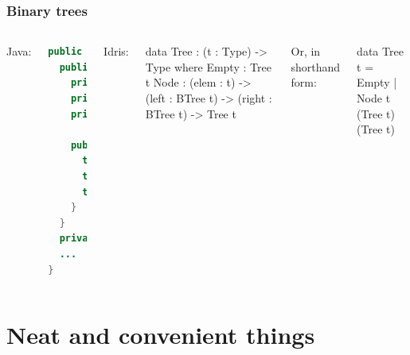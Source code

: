 \documentclass{beamer}
\begin{document}
  \begin{frame}[fragile]
    \frametitle{Binary trees}

    \begin{columns}
      Java:
      {\scriptsize
      \begin{lstlisting}[language=java]
public class Tree<T> {
  public static class Node<T> {
    private T content;
    private Node<T> left;
    private Node<T> right;

    public Node(T elem) {
      this.elem = elem;
      this.right = null;
      this.left = null;
    }
  }
  private Node<T> root;
  ...
}
      \end{lstlisting}
      }

      Idris:

      \begin{idrislisting}[basicstyle=\ttfamily\scriptsize]
data Tree : (t : Type) -> Type where
  Empty : Tree t
  Node  : (elem : t) ->
          (left : BTree t) ->
          (right : BTree t) ->
          Tree t
      \end{idrislisting}

      \vspace*{1mm}

      {\footnotesize Or, in shorthand form:}

      \vspace*{-2mm}

      \begin{idrislisting}[basicstyle=\ttfamily\scriptsize]
data Tree t
  = Empty
  | Node t (Tree t) (Tree t)
      \end{idrislisting}
    \end{columns}

\end{frame}


\section{Neat and convenient things}
\end{document}
